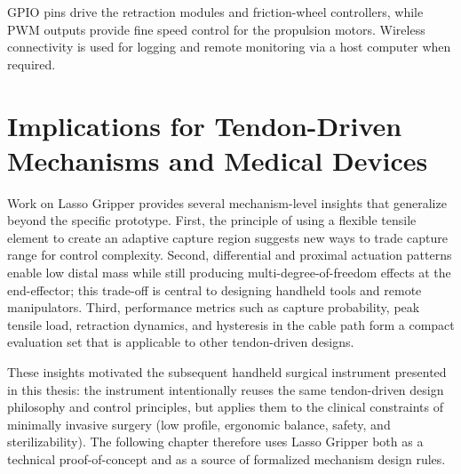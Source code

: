 GPIO pins drive the retraction modules and friction-wheel controllers, while PWM outputs provide fine speed control for the propulsion motors. Wireless connectivity is used for logging and remote monitoring via a host computer when required.

\section{Implications for Tendon-Driven Mechanisms and Medical Devices}

Work on Lasso Gripper provides several mechanism-level insights that generalize beyond the specific prototype. First, the principle of using a flexible tensile element to create an adaptive capture region suggests new ways to trade capture range for control complexity. Second, differential and proximal actuation patterns enable low distal mass while still producing multi-degree-of-freedom effects at the end-effector; this trade-off is central to designing handheld tools and remote manipulators. Third, performance metrics such as capture probability, peak tensile load, retraction dynamics, and hysteresis in the cable path form a compact evaluation set that is applicable to other tendon-driven designs.

These insights motivated the subsequent handheld surgical instrument presented in this thesis: the instrument intentionally reuses the same tendon-driven design philosophy and control principles, but applies them to the clinical constraints of minimally invasive surgery (low profile, ergonomic balance, safety, and sterilizability). The following chapter therefore uses Lasso Gripper both as a technical proof-of-concept and as a source of formalized mechanism design rules.
